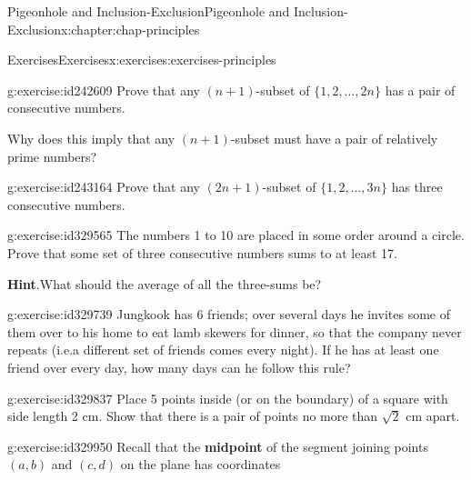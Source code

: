 \documentclass[oneside,10pt,]{book}
\newcommand{\blocktitlefont}{\relax}
\newcommand{\terminology}[1]{\textbf{#1}}
\numberwithin{equation}{section}
\begin{document}
\begin{chapterptx}{Pigeonhole and Inclusion-Exclusion}{}{Pigeonhole and Inclusion-Exclusion}{}{}{x:chapter:chap-principles}
\begin{exercises-section}{Exercises}{}{Exercises}{}{}{x:exercises:exercises-principles}
\begin{introduction}{}
\end{introduction}%
\begin{divisionexercise}{1}{}{}{g:exercise:id242609}%
Prove that any \((n+1)\)-subset of \(\{1,2,\ldots,2n\}\) has a pair of consecutive numbers.%
\par
Why does this imply that any \((n+1)\)-subset must have a pair of relatively prime numbers?%
\end{divisionexercise}%
\begin{divisionexercise}{2}{}{}{g:exercise:id243164}%
Prove that any \((2n+1)\)-subset of \(\{1,2,\ldots,3n\}\) has three consecutive numbers.%
\end{divisionexercise}%
\begin{divisionexercise}{3}{}{}{g:exercise:id329565}%
The numbers 1 to 10 are placed in some order around a circle. Prove that some set of three consecutive numbers sums to at least 17.%
\par\smallskip%
\noindent\textbf{\blocktitlefont Hint}.\hypertarget{g:hint:id329591}{}\quad{}What should the average of all the three-sums be?%
\end{divisionexercise}%
\begin{divisionexercise}{4}{}{}{g:exercise:id329739}%
Jungkook has 6 friends; over several days he invites some of them over to his home to eat lamb skewers for dinner, so that the company never repeats (i.e.\@ a different set of friends comes every night). If he has at least one friend over every day, how many days can he follow this rule?%
\par
%
\end{divisionexercise}%
\begin{divisionexercise}{5}{}{}{g:exercise:id329837}%
Place 5 points inside (or on the boundary) of a square with side length 2 cm. Show that there is a pair of points no more than \(\sqrt{2}\) cm apart.%
\begin{sidebyside}{1}{0.425}{0.425}{0}%
\begin{sbspanel}{0.15}%
%
\end{sbspanel}%
\end{sidebyside}%
\end{divisionexercise}%
\begin{divisionexercise}{6}{}{}{g:exercise:id329950}%
Recall that the \terminology{midpoint} of the segment joining points \((a,b)\) and \((c,d)\) on the plane has coordinates%

\end{divisionexercise}
\end{exercises-section}
\end{chapterptx}
\end{document}

